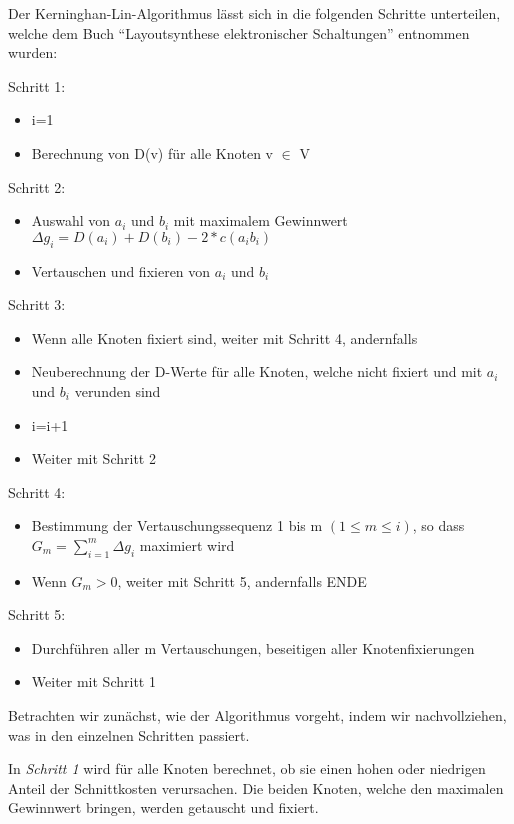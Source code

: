 Der Kerninghan-Lin-Algorithmus lässt sich in die folgenden Schritte
unterteilen, welche dem Buch "`Layoutsynthese elektronischer
Schaltungen"' \cite{Layout} entnommen wurden:\vspace{10pt}

Schritt 1:
\begin{itemize}
  \item i=1
  \item Berechnung von D(v) für alle Knoten v $\in$ V
\end{itemize}

Schritt 2:
\begin{itemize}
  \item Auswahl von $a_i$ und $b_i$ mit maximalem Gewinnwert $\Delta g_i =
  D(a_i) + D(b_i) - 2 * c(a_i b_i)$
  \item Vertauschen und fixieren von $a_i$ und $b_i$
\end{itemize}


Schritt 3:
\begin{itemize}
  \item Wenn alle Knoten fixiert sind, weiter mit Schritt 4, andernfalls
  \item Neuberechnung der D-Werte für alle Knoten, welche nicht fixiert und
  mit $a_i$ und $b_i$ verunden sind
  \item i=i+1
  \item Weiter mit Schritt 2
\end{itemize}

Schritt 4:
\begin{itemize}
  \item Bestimmung der Vertauschungssequenz 1 bis m $(1 \leq m \leq i)$, so dass
  $G_m = \sum_{i=1}^{m}{\Delta g_i}$ maximiert wird
  \item Wenn $G_m > 0$, weiter mit Schritt 5, andernfalls ENDE
\end{itemize}

Schritt 5:
\begin{itemize}
  \item Durchführen aller m Vertauschungen, beseitigen aller Knotenfixierungen
  \item Weiter mit Schritt 1
\end{itemize}\vspace{10pt}

Betrachten wir zunächst, wie der Algorithmus vorgeht, indem wir
nachvollziehen, was in den einzelnen Schritten passiert.\vspace{10pt}

In \textit{Schritt 1} wird für alle Knoten berechnet, ob sie einen hohen oder
niedrigen Anteil der Schnittkosten verursachen. Die beiden Knoten, welche den
maximalen Gewinnwert bringen, werden getauscht und fixiert.\vspace{10pt}

